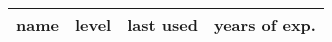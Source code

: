 \begin{tabular}{|c|c|c|c|}
\hline
name & level & last used & years of exp. \\
\hline

\end{tabular}
